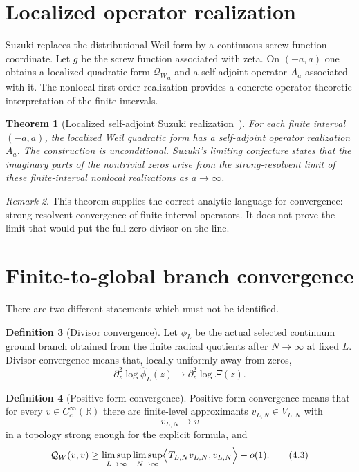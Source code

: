 \documentclass[11pt]{amsart}
\newtheorem{theorem}{Theorem}[section]
\theoremstyle{definition}
\newtheorem{definition}[theorem]{Definition}
\theoremstyle{remark}
\newtheorem{remark}[theorem]{Remark}
\newcommand{\R}{\mathbb R}
\newcommand{\QW}{\mathcal Q_W}
\newcommand{\XiR}{\Xi}
\begin{document}
\section{Localized operator realization}

Suzuki replaces the distributional Weil form by a continuous screw-function
coordinate.  Let \(g\) be the screw function associated with zeta.  On
\((-a,a)\) one obtains a localized quadratic form \({\QW}_a\) and a
self-adjoint operator \(A_a\) associated with it.  The nonlocal
first-order realization provides a concrete operator-theoretic
interpretation of the finite intervals.

\begin{theorem}[Localized self-adjoint Suzuki realization~\cite{Suzuki2025,SuzukiScrew}]
\label{thm:suzuki-input}
For each finite interval \((-a,a)\), the localized Weil quadratic form has
a self-adjoint operator realization \(A_a\).  The construction is
unconditional.  Suzuki's limiting conjecture states that the imaginary
parts of the nontrivial zeros arise from the strong-resolvent limit of
these finite-interval nonlocal realizations as \(a\to\infty\).
\end{theorem}

\begin{remark}
This theorem supplies the correct analytic language for convergence: strong
resolvent convergence of finite-interval operators.  It does not prove the
limit that would put the full zero divisor on the line.
\end{remark}

\section{Finite-to-global branch convergence}

There are two different statements which must not be identified.

\begin{definition}[Divisor convergence]
Let \(\phi_L\) be the actual selected continuum ground branch obtained from
the finite radical quotients after \(N\to\infty\) at fixed \(L\).  Divisor
convergence means that, locally uniformly away from zeros,
\[
 \partial_z^2\log \widehat\phi_L(z)
 \longrightarrow
 \partial_z^2\log \XiR(z).
\tag{4.1}
\]
\end{definition}

\begin{definition}[Positive-form convergence]
Positive-form convergence means that for every \(v\in C_c^\infty(\R)\)
there are finite-level approximants \(v_{L,N}\in V_{L,N}\) with
\[
 v_{L,N}\to v
\tag{4.2}
\]
in a topology strong enough for the explicit formula, and
\[
 \QW(v,v)
 \ge
 \limsup_{L\to\infty}\limsup_{N\to\infty}
 \Bigl\langle T_{L,N}v_{L,N},v_{L,N}\Bigr\rangle
 -
 o(1).
\tag{4.3}
\]
\end{definition}
\end{document}
